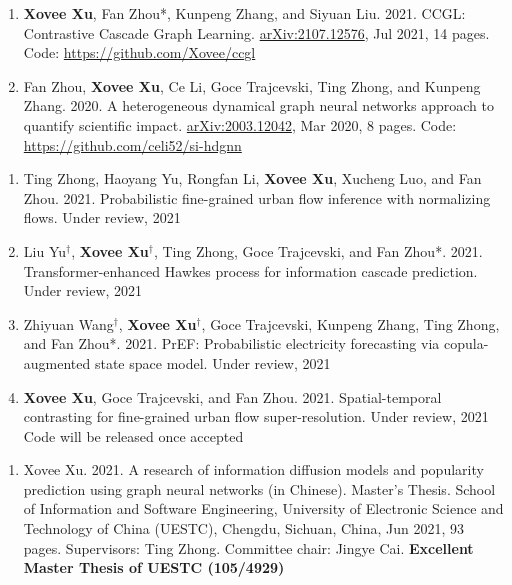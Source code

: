 
\begin{enumerate}[resume]
    \item \textbf{Xovee Xu}, Fan Zhou*, Kunpeng Zhang, and Siyuan Liu. 2021. CCGL: Contrastive Cascade Graph Learning. \href{https://arxiv.org/abs/2107.12576}{arXiv:2107.12576}, Jul 2021, 14 pages. \newline Code: {\color{gray}\url{https://github.com/Xovee/ccgl}}
    \item Fan Zhou, \textbf{Xovee Xu}, Ce Li, Goce Trajcevski, Ting Zhong, and Kunpeng Zhang. 2020. A heterogeneous dynamical graph neural networks approach to quantify scientific impact. \href{https://arxiv.org/abs/2003.12042}{arXiv:2003.12042}, Mar 2020, 8 pages. \newline Code: {\color{gray}\url{https://github.com/celi52/si-hdgnn}}
\end{enumerate}


\begin{enumerate}[resume]
    \item Ting Zhong, Haoyang Yu, Rongfan Li, \textbf{Xovee Xu}, Xucheng Luo, and Fan Zhou. 2021. Probabilistic fine-grained urban flow inference with normalizing flows. Under review, 2021
    \item Liu Yu$^\dagger$, \textbf{Xovee Xu}$^\dagger$, Ting Zhong, Goce Trajcevski, and Fan Zhou*. 2021. Transformer-enhanced Hawkes process for information cascade prediction. Under review, 2021
    \item Zhiyuan Wang$^\dagger$, \textbf{Xovee Xu}$^\dagger$, Goce Trajcevski, Kunpeng Zhang, Ting Zhong, and Fan Zhou*. 2021. PrEF: Probabilistic electricity forecasting via copula-augmented state space model. Under review, 2021 
    \item \textbf{Xovee Xu}, Goce Trajcevski, and Fan Zhou. 2021. Spatial-temporal contrasting for fine-grained urban flow super-resolution. Under review, 2021 \newline Code will be released once accepted
\end{enumerate}


\begin{enumerate}
    \item Xovee Xu. 2021. A research of information diffusion models and popularity prediction using graph neural networks (in Chinese). Master's Thesis. School of Information and Software Engineering, University of Electronic Science and Technology of China (UESTC), Chengdu, Sichuan, China, Jun 2021, 93 pages. Supervisors: Ting Zhong. Committee chair: Jingye Cai. \newline
    \textbf{\color{red}Excellent Master Thesis of UESTC (105/4929)}
\end{enumerate}

